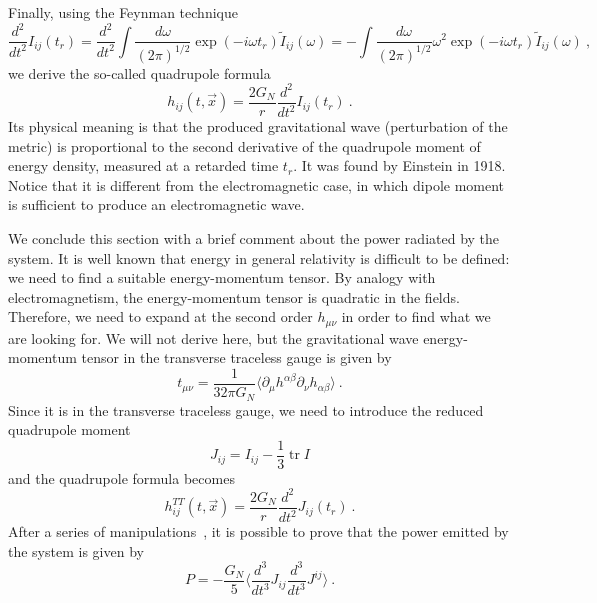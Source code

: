 \documentclass[a4paper]{article}
\newcommand{\dvd}[2]{\frac{d^2#1}{d#2^2}}
\newcommand{\dvt}[2]{\frac{d^3#1}{d#2^3}}
\newcommand{\av}[1]{\langle#1\rangle}
\DeclareMathOperator{\tr}{tr}
\begin{document}
    Finally, using the Feynman technique
    \begin{equation*}
        \dvd{}{t} I_{ij} (t_r) = \dvd{}{t} \int \frac{d\omega}{(2\pi)^{1/2}} \exp(- i \omega t_r) \tilde I_{ij} (\omega) = - \int \frac{d\omega}{(2\pi)^{1/2}} \omega^2 \exp(- i \omega t_r) \tilde I_{ij} (\omega) ~,
    \end{equation*}
    we derive the so-called quadrupole formula
    \begin{equation}\label{quadform}
        h_{ij} (t, \vec x) = \frac{2 G_N}{r} \dvd{}{t} I_{ij} (t_r) ~.
    \end{equation}
    Its physical meaning is that the produced gravitational wave (perturbation of the metric) is proportional to the second derivative of the quadrupole moment of energy density, measured at a retarded time $t_r$. It was found by Einstein in 1918. Notice that it is different from the electromagnetic case, in which dipole moment is sufficient to produce an electromagnetic wave.

    We conclude this section with a brief comment about the power radiated by the system. It is well known that energy in general relativity is difficult to be defined: we need to find a suitable energy-momentum tensor. By analogy with electromagnetism, the energy-momentum tensor is quadratic in the fields. Therefore, we need to expand at the second order $h_{\mu\nu}$ in order to find what we are looking for. We will not derive here, but the gravitational wave energy-momentum tensor in the transverse traceless gauge is given by
    \begin{equation*}
        t_{\mu\nu} = \frac{1}{32 \pi G_N} \av{\partial_\mu h^{\alpha \beta} \partial_\nu h_{\alpha \beta}} ~.
    \end{equation*}
    Since it is in the transverse traceless gauge, we need to introduce the reduced quadrupole moment 
    \begin{equation}\label{redquad}
        J_{ij} = I_{ij} - \frac{1}{3} \tr I 
    \end{equation}
    and the quadrupole formula becomes 
    \begin{equation*}
        h_{ij}^{TT} (t, \vec x) = \frac{2G_N}{r} \dvd{}{t} J_{ij} (t_r) ~.
    \end{equation*}
    After a series of manipulations~\cite{carroll}, it is possible to prove that the power emitted by the system is given by 
    \begin{equation}\label{pow}
        P = - \frac{G_N}{5} \av{\dvt{}{t} J_{ij} \dvt{}{t} J^{ij}} ~.
    \end{equation}
\end{document}
